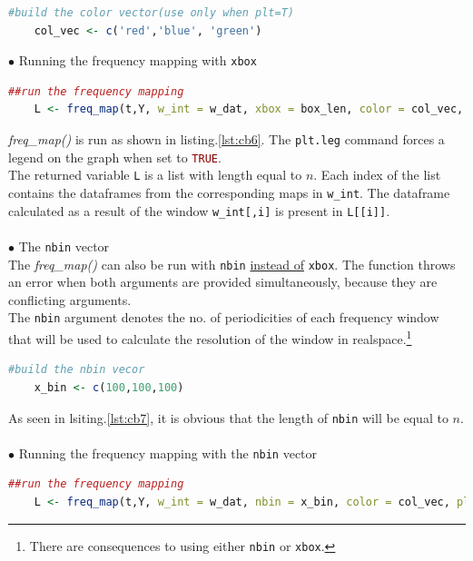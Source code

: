 \documentclass{article}
\begin{document}
\begin{lstlisting}[language=R, label={lst:cb5}, caption={vector of colours to use in the plot}, captionpos=b]
	#build the color vector(use only when plt=T)
	col_vec <- c('red','blue', 'green')
\end{lstlisting}
$\bullet$ Running the frequency mapping with \lstinline[language=R]|xbox|
\begin{lstlisting}[language=R, label={lst:cb6}, caption={Run the frequency map with xbox}, captionpos=b]
	##run the frequency mapping
	L <- freq_map(t,Y, w_int = w_dat, xbox = box_len, color = col_vec, plt = T, plt.leg = T)
\end{lstlisting}
\textit{freq\_map()} is run as shown in listing.\ref{lst:cb6}. The \lstinline[language=R]|plt.leg| command forces a legend on the graph when set to \lstinline[language=R]|TRUE|.\\
The  returned variable \lstinline[language=R]|L| is a list with length equal to $n$. Each index of the list contains the dataframes from the corresponding maps in \lstinline[language=R]|w_int|. The dataframe calculated as a result of the window \lstinline[language=R]|w_int[,i]| is present in \lstinline[language=R]|L[[i]]|.\\
  \\
$\bullet$ The \lstinline[language=R]|nbin| vector\\
The \textit{freq\_map()} can also be run with \lstinline[language=R]|nbin| \underline{instead of} \lstinline[language=R]|xbox|. The function throws an error when both arguments are provided simultaneously, because they are conflicting arguments.\\
The \lstinline[language=R]|nbin| argument denotes the no. of periodicities of each frequency window that will be used to calculate the resolution of the window in realspace.\footnote{There are consequences to using either \lstinline[language=R]|nbin| or \lstinline[language=R]|xbox|.} 
\begin{lstlisting}[language=R, label={lst:cb7}, caption={code for the nbin vector}, captionpos=b]
	#build the nbin vecor
	x_bin <- c(100,100,100)
\end{lstlisting}
As seen in lsiting.\ref{lst:cb7}, it is obvious that the length of \lstinline[language=R]|nbin| will be equal to $n$.\\
\pagebreak
  \\
$\bullet$ Running the frequency mapping with the \lstinline[language=R]|nbin| vector
\begin{lstlisting}[language=R, label={lst:cb8}, caption={Run the frequency map with nbin}, captionpos=b]
	##run the frequency mapping
	L <- freq_map(t,Y, w_int = w_dat, nbin = x_bin, color = col_vec, plt = T, plt.leg = T)
\end{lstlisting}
\end{document}
